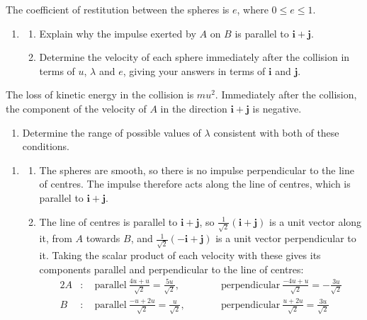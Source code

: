 \documentclass[leqno]{article}
\begin{document}
\begin{enumerate}[
  label=\textbf{\arabic*.},
  leftmargin=*,
  topsep=0pt,
  partopsep=0pt,
  parsep=0pt
]
The coefficient of restitution between the spheres is $e$, where $0\leq e\leq1$. \\
\begin{enumerate}[label=\textbf{(\alph*)}]
\item
\begin{enumerate}[label=(\roman*)]
\item Explain why the impulse exerted by $A$ on $B$ is parallel to $\mathbf{i}+\mathbf{j}$.  \\
\item Determine the velocity of each sphere immediately after the collision in terms of $u$, $\lambda$ and $e$, giving your answers in terms of $\mathbf{i}$ and $\mathbf{j}$.  \\
\end{enumerate}
\end{enumerate}
The loss of kinetic energy in the collision is $mu^2$. Immediately after the collision, the component of the velocity of $A$ in the direction $\mathbf{i}+\mathbf{j}$ is negative. \\
\begin{enumerate}[label=\textbf{(\alph*)}, resume]
\item Determine the range of possible values of $\lambda$ consistent with both of these conditions.  \\
\end{enumerate}

\vspace*{10pt}

\begin{djsSolution}
\begin{enumerate}[label=\textbf{(\alph*)}, start=1]
\item
\begin{enumerate}[label=(\roman*), start=1]
\item The spheres are smooth, so there is no impulse perpendicular to the line of centres. The impulse therefore acts along the line of centres, which is parallel to \(\mathbf{i}+\mathbf{j}\).

\item The line of centres is parallel to \(\mathbf{i}+\mathbf{j}\), so \(\frac{1}{\sqrt2}(\mathbf{i}+\mathbf{j})\) is a unit vector along it, from \(A\) towards \(B\), and \(\frac{1}{\sqrt2}(-\mathbf{i}+\mathbf{j})\) is a unit vector perpendicular to it. Taking the scalar product of each velocity with these gives its components parallel and perpendicular to the line of centres:
\begin{alignat*}{2}
A&:\quad\text{parallel}\ \frac{4u+u}{\sqrt2}=\frac{5u}{\sqrt2},&\qquad&\text{perpendicular}\ \frac{-4u+u}{\sqrt2}=-\frac{3u}{\sqrt2}\\
B&:\quad\text{parallel}\ \frac{-u+2u}{\sqrt2}=\frac{u}{\sqrt2},&&\text{perpendicular}\ \frac{u+2u}{\sqrt2}=\frac{3u}{\sqrt2}
\end{alignat*}


\end{enumerate}
\end{enumerate}
\end{djsSolution}
\end{enumerate}
\end{document}
